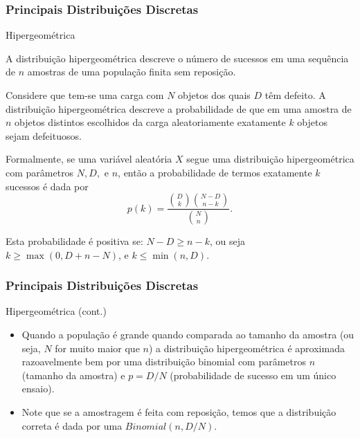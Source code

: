 \begin{frame}
\frametitle{\textbf{Principais Distribuições  Discretas}}
\baselineskip=13pt
\begin{block}{Hipergeométrica}


A distribuição hipergeométrica descreve o número de sucessos em uma
sequência de $n$ amostras de uma população finita sem reposição.

\medskip

Considere que tem-se uma carga com $N$ objetos dos
quais $D$ têm defeito. A distribuição hipergeométrica descreve a
probabilidade de que em uma amostra de $n$ objetos distintos
escolhidos da carga aleatoriamente exatamente $k$ objetos sejam
defeituosos.

\medskip

Formalmente, se uma variável aleatória $X$ segue uma distribuição
hipergeométrica com parâmetros  $N, D,$ e $n$, então a probabilidade de
termos exatamente $k$ sucessos é dada por
$$p(k)=\frac{\binom{D}{k}\binom{N-D}{n-k}}{\binom{N}{n}}.$$

Esta probabilidade é positiva se: $N-D\geq n-k$, ou seja
$k\geq\max(0,D+n-N)$, e $k\leq \min(n,D)$.


\end{block}
\end{frame}

\begin{frame}
\frametitle{\textbf{Principais Distribuições Discretas}}
\baselineskip=13pt
\begin{block}{Hipergeométrica (cont.)}



\begin{itemize}
\item Quando a população é grande quando comparada ao tamanho da amostra
(ou seja, $N$ for muito maior que $n$) a distribuição
hipergeométrica é aproximada razoavelmente bem por uma distribuição
binomial com parâmetros $n$ (tamanho da amostra) e $p = D / N$
(probabilidade de sucesso em um único ensaio).

\item Note que se a amostragem é feita com reposição, temos que a distribuição correta é dada por uma $Binomial(n,D/N)$.
\end{itemize}

\end{block}
\end{frame}

